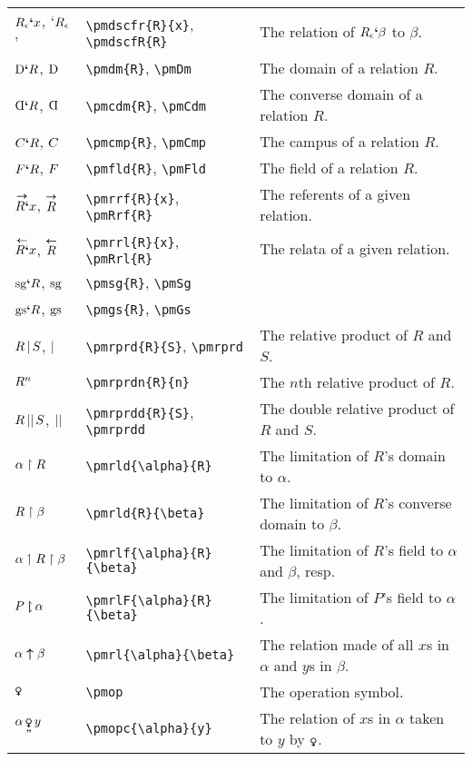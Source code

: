 \documentclass[12pt]{article}
\begin{document}
\noindent \begin{tabular}{@{}p{3cm} | p{5cm} | p{8.25cm}}
	$R_{\mathop{\epsilon}}\textbf{`}x$, `$R_{\mathop{\epsilon}}$'& \verb|\pmdscfr{R}{x}|, \verb|\pmdscfR{R}| & The relation of $R_{\mathop{\epsilon}}\textbf{`}\beta$ to $\beta$. \\
	$\text{D}\textbf{`}R$, $\text{D}$ & \verb|\pmdm{R}|, \verb|\pmDm| & The domain of a relation $R$.  \\
	$\pmcdm{R}$, $\pmCdm$ & \verb|\pmcdm{R}|, \verb|\pmCdm| & The converse domain of a relation $R$. \\
	$C\textbf{`}R$, $C$ & \verb|\pmcmp{R}|, \verb|\pmCmp| & The campus of a relation $R$.  \\
	$F\textbf{`}R$, $F$ & \verb|\pmfld{R}|, \verb|\pmFld| & The field of a relation $R$. \\
	$\overset{\boldsymbol{\rightarrow}}{R\textbf{`}}x$, $\overset{\boldsymbol{\rightarrow}}{R}$ & \verb|\pmrrf{R}{x}|, \verb|\pmRrf{R}| & The referents of a given relation. \\
	$\overset{\boldsymbol{\leftarrow}}{R\textbf{`}}x$, $\overset{\boldsymbol{\leftarrow}}{R}$ & \verb|\pmrrl{R}{x}|, \verb|\pmRrl{R}| & The relata of a given relation. \\
	$\text{sg}\textbf{`}R$, $\text{sg}$ & \verb|\pmsg{R}|, \verb|\pmSg| &  \\
	$\text{gs}\textbf{`}R$, $\text{gs}$ & \verb|\pmgs{R}|, \verb|\pmGs| &  \\
	${R}\mathop{|}{S}$, $\mathop{|}$ & \verb|\pmrprd{R}{S}|, \verb|\pmrprd| &  The relative product of $R$ and $S$. \\
	$R^{n}$ & \verb|\pmrprdn{R}{n}| & The $n$th relative product of $R$. \\
	${R}\mathop{||}{S}$, $\mathop{||}$ & \verb|\pmrprdd{R}{S}|, \verb|\pmrprdd| &  The double relative product of $R$ and $S$. \\
	$\alpha \boldsymbol{\upharpoonright} R$ & \verb|\pmrld{\alpha}{R}| & The limitation of $R$'s domain to $\alpha$. \\
	$R \boldsymbol{\upharpoonright} \beta$ & \verb|\pmrld{R}{\beta}| & The limitation of $R$'s converse domain to $\beta$. \\
	$\alpha \boldsymbol{\upharpoonleft} R \boldsymbol{\upharpoonright} \beta$ & \verb|\pmrlf{\alpha}{R}{\beta}| & The limitation of $R$'s field to $\alpha$ and $\beta$, resp. \\ 
	$\pmrlF{P}{\alpha}$ & \verb|\pmrlF{\alpha}{R}{\beta}| & The limitation of $P$'s field to $\alpha$. \\ 
	$\alpha \boldsymbol{\uparrow} \beta$ & \verb|\pmrl{\alpha}{\beta}| & The relation made of all $x$s in $\alpha$ and $y$s in $\beta$. \\
	$\pmop$ & \verb|\pmop| & The operation symbol. \\
	$\pmopc{\alpha}{y}$ & \verb|\pmopc{\alpha}{y}| & The relation of $x$s in $\alpha$ taken to $y$ by $\pmop$. \\

\end{tabular}
\end{document}
